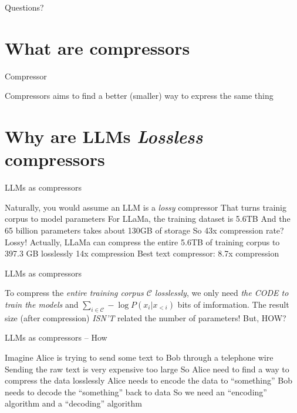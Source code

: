 \documentclass[scheme=plain]{ctexbeamer}
\begin{document}
\begin{frame}[standout]
  Questions?
\end{frame}

\section[Compressors]{What are compressors}
\begin{frame}{Compressor}
  \begin{outline}
    \1 Compressors aims to find a better (smaller) way to express the same thing
    \1 
  \end{outline}
\end{frame}

\section[LLMs as compressors]{Why are LLMs \emph{Lossless} compressors}

\begin{frame}{LLMs as compressors}
  \begin{outline}
    \1 Naturally, you would assume an LLM is a \emph{lossy} compressor
      \2 That turns trainig corpus to model parameters
      \2 For LLaMa, the training dataset is 5.6TB
      \2 And the 65 billion parameters takes about 130GB of storage
        \3 So 43x compression rate?
        \3 Lossy!
    \pause
    \1 Actually, LLaMa can compress the entire 5.6TB of training corpus to 397.3 GB losslessly
      \2 14x compression
      \2 Best text compressor: 8.7x compression
  \end{outline}
\end{frame}



\begin{frame}{LLMs as compressors}
  \begin{outline}
    \1 To compress the \emph{entire training corpus $\mathcal{C}$ losslessly}, we only need \emph{the CODE to train the models} and $\sum_{i \in \mathcal{C}} - \log P(x_i | x_{<i}) $ bits of imformation.
      \2 The result size (after compression) \emph{ISN'T} related the number of parameters!
      \pause
    \1 But, HOW?
  \end{outline}
\end{frame}

\begin{frame}{LLMs as compressors -- How}
  \begin{outline}
    \1 Imagine Alice is trying to send some text to Bob through a telephone wire
    \1 Sending the raw text is very expensive
      \2 too large
    \1 So Alice need to find a way to compress the data losslessly
    \1 Alice needs to encode the data to ``something''
    \1 Bob needs to decode the ``something'' back to data
    \1 So we need an ``encoding'' algorithm and a ``decoding'' algorithm
  \end{outline}
\end{frame}
\end{document}
